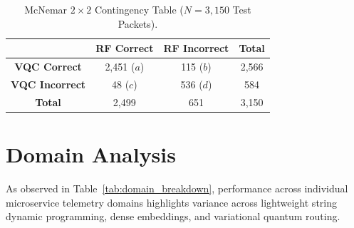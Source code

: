 \documentclass[journal]{IEEEtran}
\begin{document}
\begin{table}[htbp]
\centering
\caption{McNemar $2 \times 2$ Contingency Table ($N=3,150$ Test Packets).}
\label{tab:mcnemar_matrix}
\begin{tabular}{c|cc|c}
\toprule
& \textbf{RF Correct} & \textbf{RF Incorrect} & \textbf{Total} \\
\hline
\textbf{VQC Correct} & 2,451 ($a$) & 115 ($b$) & 2,566 \\
\textbf{VQC Incorrect} & 48 ($c$) & 536 ($d$) & 584 \\
\hline
\textbf{Total} & 2,499 & 651 & 3,150 \\
\bottomrule
\end{tabular}
\end{table}


\section{Domain Analysis}
As observed in Table~\ref{tab:domain_breakdown}, performance across individual microservice telemetry domains highlights variance across lightweight string dynamic programming, dense embeddings, and variational quantum routing.
\end{document}
